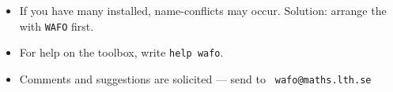\begin{itemize}
\item If you have many  installed, name-conflicts may occur. 
Solution: arrange the  with \verb+WAFO+ first.

\item
For help on the toolbox, write \verb+help wafo+. 


\item
Comments and suggestions are solicited --- send to 
%
\verb+ wafo@maths.lth.se+

\end{itemize}

